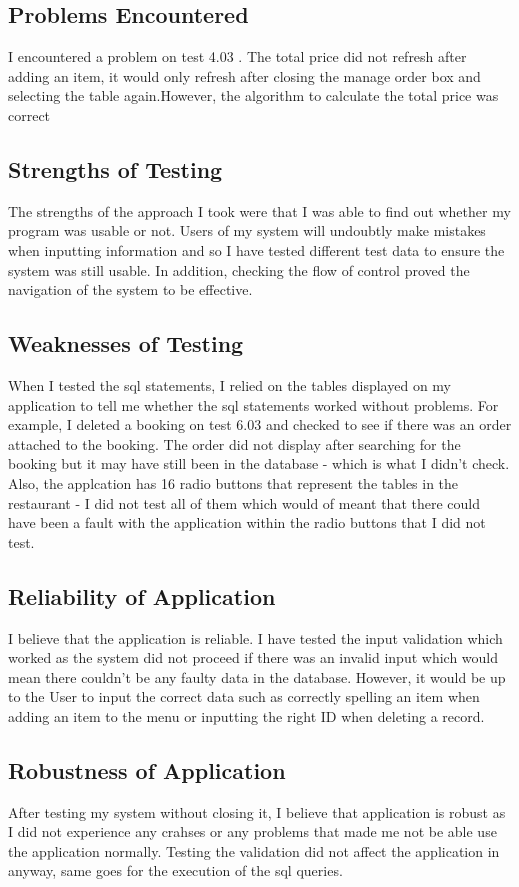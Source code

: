 \subsection{Problems Encountered}

I encountered a problem on test 4.03 . The total price did not refresh after adding an item, it would only refresh after closing the manage order box and selecting the table again.However, the algorithm to calculate the total price was correct  

\subsection{Strengths of Testing}

The strengths of the approach I took were that I was able to find out whether my program was usable or not. Users of my system will undoubtly make mistakes when inputting information and so I have tested different test data to ensure the system was still usable. In addition, checking the flow of control proved the navigation of the system to be effective.

\subsection{Weaknesses of Testing}

When I tested the sql statements, I relied on the tables displayed on my application to tell me whether the sql statements worked without problems. For example, I deleted a booking on test 6.03 and checked to see if there was an order attached to the booking. The order did not display after searching for the booking but it may have still been in the database - which is what I didn't check. Also, the applcation has 16 radio buttons that represent the tables in the restaurant - I did not test all of them which would of meant that there could have been a fault with the application within the radio buttons that I did not test.

\subsection{Reliability of Application}

I believe that the application is reliable. I have tested the input validation which worked as the system did not proceed if there was an invalid input which would mean there couldn't be any faulty data in the database. However, it would be up to the User to input the correct data such as correctly spelling an item when adding an item to the menu or inputting the right ID when deleting a record.


\subsection{Robustness of Application}
After testing my system without closing it, I believe that application is robust as I did not experience any crahses or any problems that made me not be able use the application normally. Testing the validation did not affect the application in anyway, same goes for the execution of the sql queries.